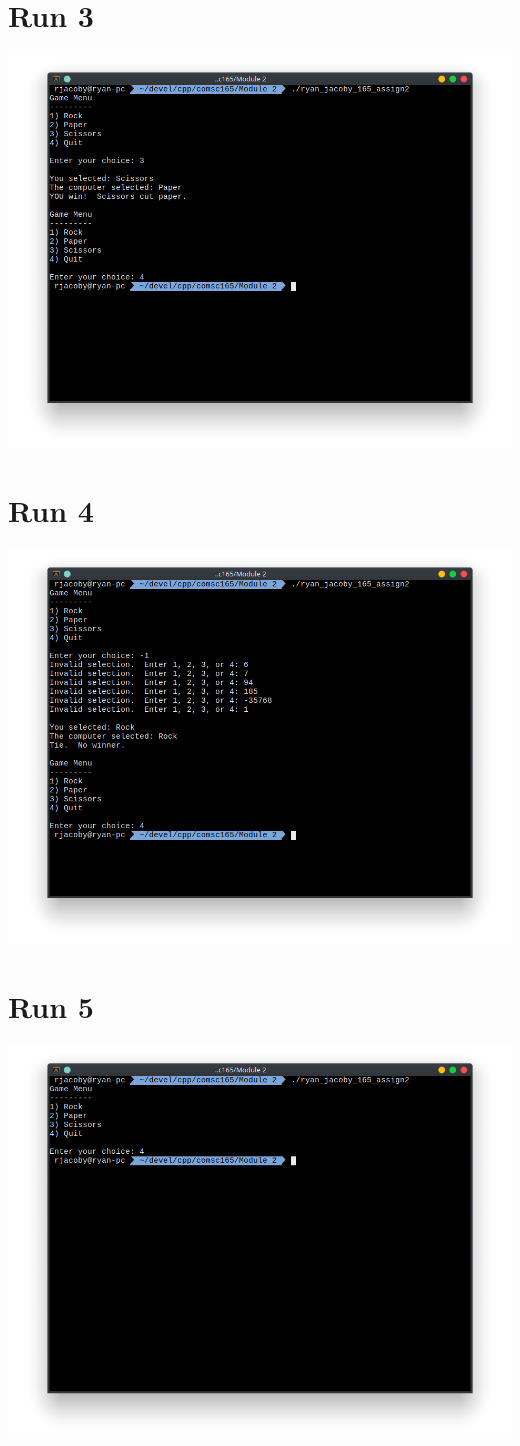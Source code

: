 \documentclass[letterpaper, 11pt]{article}
\begin{document}
\section*{Run 3}
\includegraphics[scale=0.5]{run3.png}

\section*{Run 4}
\includegraphics[scale=0.5]{run4.png}

\section*{Run 5}
\includegraphics[scale=0.5]{run5.png}
\end{document}
